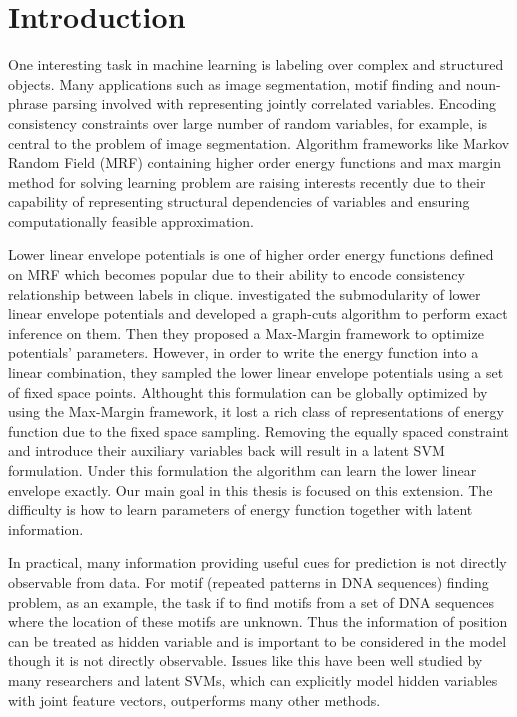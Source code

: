 
\chapter{Introduction}
\label{cha:intro}

One interesting task in machine learning is labeling over complex
and structured objects. Many applications such as image
segmentation, motif finding and noun-phrase parsing involved with
representing jointly correlated variables. Encoding consistency
constraints over large number of random variables, for example,
is central to the problem of image segmentation. Algorithm
frameworks like Markov Random Field (MRF) containing higher order
energy functions and max margin method for solving learning
problem are raising interests recently due to their capability of
representing structural dependencies of variables and ensuring
computationally feasible approximation.
  
Lower linear envelope potentials is one of higher order energy
functions defined on MRF which becomes popular due to their
ability to encode consistency relationship between labels in
clique.  investigated the submodularity
of lower linear envelope potentials and developed a graph-cuts
algorithm to perform exact inference on them. Then they proposed
a Max-Margin framework to optimize potentials' parameters.
However, in order to write the energy function into a linear
combination, they sampled the lower linear envelope potentials
using a set of fixed space points. Althought this formulation can
be globally optimized by using the Max-Margin framework, it lost
a rich class of representations of energy function due to the
fixed space sampling. Removing the equally spaced constraint and
introduce their auxiliary variables back will result in a latent
SVM formulation. Under this formulation the algorithm can learn
the lower linear envelope exactly. Our main goal in this thesis
is focused on this extension. The difficulty is how to learn
parameters of energy function together with latent information.
  
In practical, many information providing useful cues for
prediction is not directly observable from data. For motif
(repeated patterns in DNA sequences) finding problem, as an
example, the task if to find motifs from a set of DNA sequences
where the location of these motifs are unknown. Thus the
information of position can be treated as hidden variable and is
important to be considered in the model though it is not directly
observable. Issues like this have been well studied by many
researchers and latent SVMs, which can explicitly model hidden
variables with joint feature vectors, outperforms many other
methods.
  
